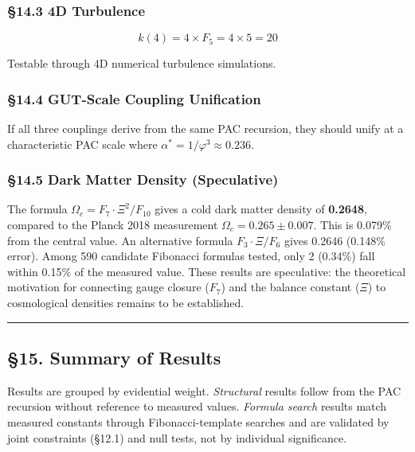 \documentclass[
  11pt,
  a4paper]{article}
\begin{document}
\subsubsection{§14.3 4D Turbulence}\label{d-turbulence}

\[k(4) = 4 \times F_5 = 4 \times 5 = 20\]

Testable through 4D numerical turbulence simulations.

\subsubsection{§14.4 GUT-Scale Coupling
Unification}\label{gut-scale-coupling-unification}

If all three couplings derive from the same PAC recursion, they should
unify at a characteristic PAC scale where
\(\alpha^* = 1/\varphi^3 \approx 0.236\).

\subsubsection{§14.5 Dark Matter Density
(Speculative)}\label{dark-matter-density-speculative}

The formula \(\Omega_c = F_7 \cdot \Xi^2 / F_{10}\) gives a cold dark
matter density of \textbf{0.2648}, compared to the Planck 2018
measurement \(\Omega_c = 0.265 \pm 0.007\). This is 0.079\% from the
central value. An alternative formula \(F_3 \cdot \Xi / F_6\) gives
0.2646 (0.148\% error). Among 590 candidate Fibonacci formulas tested,
only 2 (0.34\%) fall within 0.15\% of the measured value. These results
are speculative: the theoretical motivation for connecting gauge closure
(\(F_7\)) and the balance constant (\(\Xi\)) to cosmological densities
remains to be established.

\begin{center}\rule{0.5\linewidth}{0.5pt}\end{center}

\subsection{§15. Summary of Results}\label{summary-of-results}

Results are grouped by evidential weight. \emph{Structural} results
follow from the PAC recursion without reference to measured values.
\emph{Formula search} results match measured constants through
Fibonacci-template searches and are validated by joint constraints
(§12.1) and null tests, not by individual significance.
\end{document}
